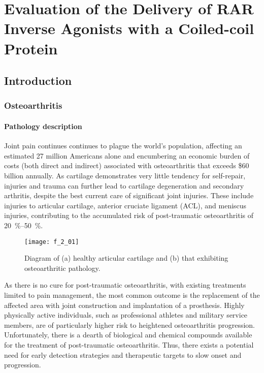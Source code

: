 \chapter{Evaluation of the Delivery of RAR Inverse Agonists with a Coiled-coil
Protein}
\label{chap:comp}

\begin{refsection}

\section{Introduction}

\subsection{Osteoarthritis}

\subsubsection{Pathology description}

Joint pain continues continues to plague the world's population, affecting an
estimated 27 million Americans alone and encumbering an economic burden of costs
(both direct and indirect) associated with osteoarthritis that exceeds \$60
billion annually.\cite{Brown} As cartilage demonstrates very little tendency for
self-repair, injuries and trauma can further lead to cartilage degeneration and
secondary arthritis, despite the best current care of significant joint
injuries.\cite{Helmerhorst2014} These include injuries to articular cartilage,
anterior cruciate ligament (ACL), and meniscus injuries, contributing to the
accumulated risk of post-traumatic osteoarthritis of
\SIrange{20}{50}{\percent}.\cite{Roos1995,Anderson2011,Reiersen1998,Buckwalter2006}
\begin{figure}[h!] \centering \texttt{[image: f\_2\_01]}
    \caption[Diagram of healthy articular cartilage and that exhibiting
    osteoarthritic pathology]{Diagram of (a) healthy articular cartilage and (b)
        that exhibiting osteoarthritic
        pathology.\cite{Wieland2005}}\label{fig:bone_diagram_1} \end{figure}
As there is no cure for post-traumatic osteoarthritis, with existing treatments
limited to pain management, the most common outcome is the replacement of the
affected area with joint construction and implantation of a prosthesis. Highly
physically active individuals, such as professional athletes and military
service members, are of particularly higher risk to heightened osteoarthritis
progression.\cite{Cameron2011} Unfortunately, there is a dearth of biological
and chemical compounds available for the treatment of post-traumatic
osteoarthritis. Thus, there exists a potential need for early detection
strategies and therapeutic targets to slow onset and progression.


\end{refsection}
